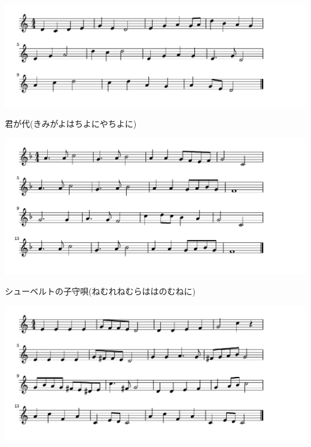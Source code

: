 \documentclass[a4paper]{ltjsarticle}
\begin{document}
\includegraphics[clip]{kimigayo_crop.pdf}

\vspace{-10mm}

\parindent=50pt 
君が代(きみがよはちよにやちよに)
\parindent=10pt

\vspace{10mm}


\includegraphics[clip]{schubertkomori_crop.pdf}

\vspace{-10mm}

\parindent=50pt 
シューベルトの子守唄(ねむれねむらははのむねに)
\parindent=10pt

\vspace{10mm}

\includegraphics[clip]{schubertnobara_crop.pdf}

\vspace{-10mm}
\end{document}
